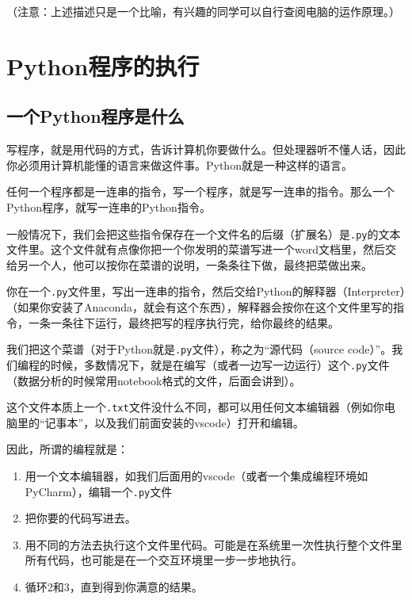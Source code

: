 \documentclass[
  letterpaper,
  DIV=11,
  numbers=noendperiod]{scrreprt}
\providecommand{\tightlist}{%
  \setlength{\itemsep}{0pt}\setlength{\parskip}{0pt}}\usepackage{longtable,booktabs,array}
\begin{document}
（注意：上述描述只是一个比喻，有兴趣的同学可以自行查阅电脑的运作原理。）

\hypertarget{pythonux7a0bux5e8fux7684ux6267ux884c}{%
\chapter{Python程序的执行}\label{pythonux7a0bux5e8fux7684ux6267ux884c}}

\hypertarget{ux4e00ux4e2apythonux7a0bux5e8fux662fux4ec0ux4e48}{%
\section{一个Python程序是什么}\label{ux4e00ux4e2apythonux7a0bux5e8fux662fux4ec0ux4e48}}

写程序，就是用代码的方式，告诉计算机你要做什么。但处理器听不懂人话，因此你必须用计算机能懂的语言来做这件事。Python就是一种这样的语言。

任何一个程序都是一连串的指令，写一个程序，就是写一连串的指令。那么一个Python程序，就写一连串的Python指令。

一般情况下，我们会把这些指令保存在一个文件名的后缀（扩展名）是\texttt{.py}的文本文件里。这个文件就有点像你把一个你发明的菜谱写进一个word文档里，然后交给另一个人，他可以按你在菜谱的说明，一条条往下做，最终把菜做出来。

你在一个\texttt{.py}文件里，写出一连串的指令，然后交给Python的解释器（Interpreter）（如果你安装了Anaconda，就会有这个东西），解释器会按你在这个文件里写的指令，一条一条往下运行，最终把写的程序执行完，给你最终的结果。

我们把这个菜谱（对于Python就是\texttt{.py}文件），称之为``源代码（source
code）''。我们编程的时候，多数情况下，就是在编写（或者一边写一边运行）这个\texttt{.py}文件（数据分析的时候常用notebook格式的文件，后面会讲到）。

这个文件本质上一个\texttt{.txt}文件没什么不同，都可以用任何文本编辑器（例如你电脑里的``记事本''，以及我们前面安装的vscode）打开和编辑。

因此，所谓的编程就是：

\begin{enumerate}
\def\labelenumi{\arabic{enumi}.}
\tightlist
\item
  用一个文本编辑器，如我们后面用的vscode（或者一个集成编程环境如PyCharm），编辑一个\texttt{.py}文件
\item
  把你要的代码写进去。
\item
  用不同的方法去执行这个文件里代码。可能是在系统里一次性执行整个文件里所有代码，也可能是在一个交互环境里一步一步地执行。
\item
  循环2和3，直到得到你满意的结果。
\end{enumerate}
\end{document}
